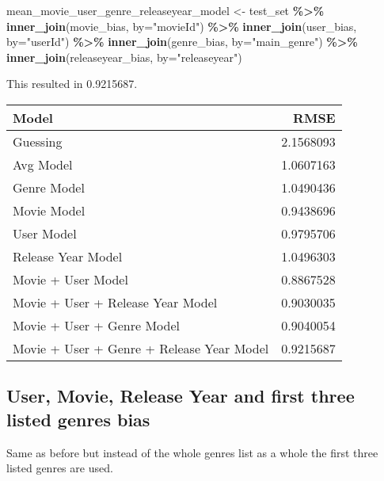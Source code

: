 \documentclass[
]{article}
\newenvironment{Shaded}{\begin{snugshade}}{\end{snugshade}}
\newcommand{\AttributeTok}[1]{\textcolor[rgb]{0.13,0.29,0.53}{#1}}
\newcommand{\FunctionTok}[1]{\textcolor[rgb]{0.13,0.29,0.53}{\textbf{#1}}}
\newcommand{\NormalTok}[1]{#1}
\newcommand{\OtherTok}[1]{\textcolor[rgb]{0.56,0.35,0.01}{#1}}
\newcommand{\SpecialCharTok}[1]{\textcolor[rgb]{0.81,0.36,0.00}{\textbf{#1}}}
\newcommand{\StringTok}[1]{\textcolor[rgb]{0.31,0.60,0.02}{#1}}
\begin{document}
\begin{Shaded}
\begin{Highlighting}[]
\NormalTok{mean\_movie\_user\_genre\_releaseyear\_model }\OtherTok{\textless{}{-}}\NormalTok{ test\_set }\SpecialCharTok{\%\textgreater{}\%}
  \FunctionTok{inner\_join}\NormalTok{(movie\_bias, }\AttributeTok{by=}\StringTok{"movieId"}\NormalTok{) }\SpecialCharTok{\%\textgreater{}\%}
  \FunctionTok{inner\_join}\NormalTok{(user\_bias, }\AttributeTok{by=}\StringTok{"userId"}\NormalTok{) }\SpecialCharTok{\%\textgreater{}\%}
  \FunctionTok{inner\_join}\NormalTok{(genre\_bias, }\AttributeTok{by=}\StringTok{"main\_genre"}\NormalTok{) }\SpecialCharTok{\%\textgreater{}\%}
  \FunctionTok{inner\_join}\NormalTok{(releaseyear\_bias, }\AttributeTok{by=}\StringTok{"releaseyear"}\NormalTok{)}
\end{Highlighting}
\end{Shaded}

This resulted in 0.9215687.

\begin{tabular}{l|r}
\hline
Model & RMSE\\
\hline
Guessing & 2.1568093\\
\hline
Avg Model & 1.0607163\\
\hline
Genre Model & 1.0490436\\
\hline
Movie Model & 0.9438696\\
\hline
User Model & 0.9795706\\
\hline
Release Year Model & 1.0496303\\
\hline
Movie + User Model & 0.8867528\\
\hline
Movie + User + Release Year Model & 0.9030035\\
\hline
Movie + User + Genre Model & 0.9040054\\
\hline
Movie + User + Genre + Release Year Model & 0.9215687\\
\hline
\end{tabular}

\hypertarget{user-movie-release-year-and-first-three-listed-genres-bias}{%
\subsection{User, Movie, Release Year and first three listed genres
bias}\label{user-movie-release-year-and-first-three-listed-genres-bias}}

Same as before but instead of the whole genres list as a whole the first
three listed genres are used.
\end{document}
